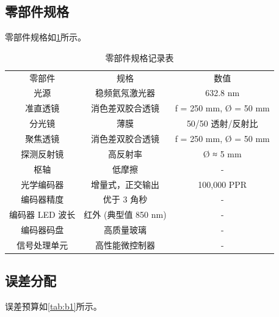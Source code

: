 \subsection{零部件规格}

零部件规格如\cref{tab:a1}所示。

\begin{table}[h!]
	\centering
	\caption{零部件规格记录表}
	\label{tab:a1}
	\begin{tabular}{ccc}
		\hline
		零部件 & 规格 & 数值 \\
		光源 & 稳频氦氖激光器 & 632.8 nm \\ 
		准直透镜 & 消色差双胶合透镜 & f = 250 mm, Ø = 50 mm \\ 
		分光镜 & 薄膜 & 50/50 透射/反射比 \\ 
		聚焦透镜 & 消色差双胶合透镜 & f = 250 mm, Ø = 50 mm \\ 
		探测反射镜 & 高反射率 & Ø ≈ 5 mm \\ 
		枢轴 & 低摩擦 & - \\ 
		光学编码器 & 增量式，正交输出 & 100,000 PPR \\ 
		编码器精度 & 优于 3 角秒 & - \\ 
		编码器 LED 波长 & 红外 (典型值 850 nm) & - \\ 
		编码器码盘 & 高质量玻璃 & - \\ 
		信号处理单元 & 高性能微控制器 & - \\ 
		\hline
	\end{tabular}
\end{table}

\subsection{误差分配}

误差预算如\cref{tab:b1}所示。

\begin{table}[h!]
	\centering
	\caption{系统误差项及控制措施预算表}
	\label{tab:b1}
\end{table}